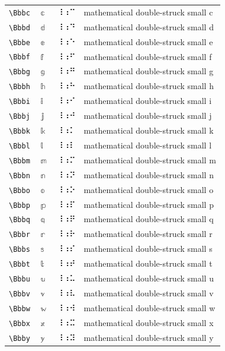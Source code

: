 \documentclass[oneside]{article}
\begin{document}
\begin{longtable}{llll}
\verb|\Bbbc| & $\Bbbc$ &  ⠸⠰⠉  & {mathematical double-struck small c} \\[2ex]
\verb|\Bbbd| & $\Bbbd$ &  ⠸⠰⠙  & {mathematical double-struck small d} \\[2ex]
\verb|\Bbbe| & $\Bbbe$ &  ⠸⠰⠑  & {mathematical double-struck small e} \\[2ex]
\verb|\Bbbf| & $\Bbbf$ &  ⠸⠰⠋  & {mathematical double-struck small f} \\[2ex]
\verb|\Bbbg| & $\Bbbg$ &  ⠸⠰⠛  & {mathematical double-struck small g} \\[2ex]
\verb|\Bbbh| & $\Bbbh$ &  ⠸⠰⠓  & {mathematical double-struck small h} \\[2ex]
\verb|\Bbbi| & $\Bbbi$ &  ⠸⠰⠊  & {mathematical double-struck small i} \\[2ex]
\verb|\Bbbj| & $\Bbbj$ &  ⠸⠰⠚  & {mathematical double-struck small j} \\[2ex]
\verb|\Bbbk| & $\Bbbk$ &  ⠸⠰⠅  & {mathematical double-struck small k} \\[2ex]
\verb|\Bbbl| & $\Bbbl$ &  ⠸⠰⠇  & {mathematical double-struck small l} \\[2ex]
\verb|\Bbbm| & $\Bbbm$ &  ⠸⠰⠍  & {mathematical double-struck small m} \\[2ex]
\verb|\Bbbn| & $\Bbbn$ &  ⠸⠰⠝  & {mathematical double-struck small n} \\[2ex]
\verb|\Bbbo| & $\Bbbo$ &  ⠸⠰⠕  & {mathematical double-struck small o} \\[2ex]
\verb|\Bbbp| & $\Bbbp$ &  ⠸⠰⠏  & {mathematical double-struck small p} \\[2ex]
\verb|\Bbbq| & $\Bbbq$ &  ⠸⠰⠟  & {mathematical double-struck small q} \\[2ex]
\verb|\Bbbr| & $\Bbbr$ &  ⠸⠰⠗  & {mathematical double-struck small r} \\[2ex]
\verb|\Bbbs| & $\Bbbs$ &  ⠸⠰⠎  & {mathematical double-struck small s} \\[2ex]
\verb|\Bbbt| & $\Bbbt$ &  ⠸⠰⠞  & {mathematical double-struck small t} \\[2ex]
\verb|\Bbbu| & $\Bbbu$ &  ⠸⠰⠥  & {mathematical double-struck small u} \\[2ex]
\verb|\Bbbv| & $\Bbbv$ &  ⠸⠰⠧  & {mathematical double-struck small v} \\[2ex]
\verb|\Bbbw| & $\Bbbw$ &  ⠸⠰⠺  & {mathematical double-struck small w} \\[2ex]
\verb|\Bbbx| & $\Bbbx$ &  ⠸⠰⠭  & {mathematical double-struck small x} \\[2ex]
\verb|\Bbby| & $\Bbby$ &  ⠸⠰⠽  & {mathematical double-struck small y} \\[2ex]

\end{longtable}
\end{document}
